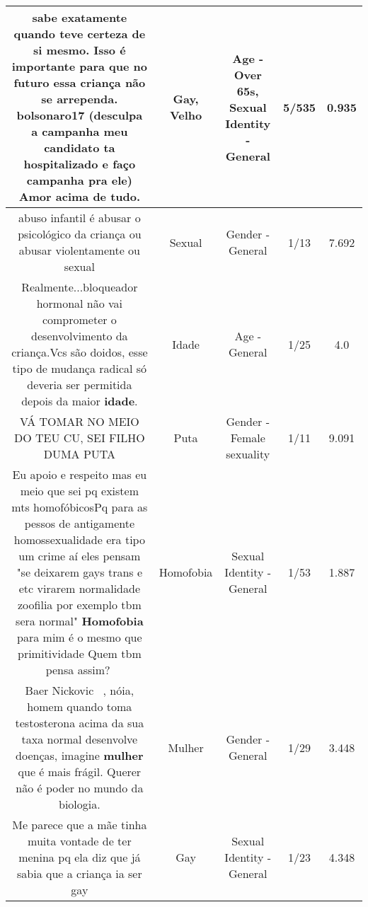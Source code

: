 \documentclass[11pt]{article}
\newlength\mylength
\begin{document}
\begin{center}
\begin{longtable}{|C{.65\mylength}|C{.30\mylength}|C{.12\mylength}|C{.12\mylength}|C{.12\mylength}|}
sabe exatamente quando teve certeza de si mesmo. Isso é importante para que no futuro essa criança não se arrependa. bolsonaro17 (desculpa a campanha meu candidato ta hospitalizado e faço campanha pra ele) Amor acima de tudo.\normalsize   & Gay, Velho & Age - Over 65s, Sexual Identity - General & 5/535 & 0.935 \\  \hline
  \small abuso infantil é abusar o psicológico da criança ou abusar violentamente ou sexual\normalsize   & Sexual & Gender - General & 1/13 & 7.692 \\  \hline
  \small Realmente...bloqueador hormonal não vai comprometer o desenvolvimento da criança.Vcs são doidos, esse tipo de mudança radical só deveria ser permitida depois da maior \textbf{idade}.\normalsize   & Idade & Age - General & 1/25 & 4.0 \\  \hline
  \small VÁ TOMAR NO MEIO DO TEU CU, SEI FILHO DUMA PUTA\normalsize   & Puta & Gender - Female sexuality & 1/11 & 9.091 \\  \hline
  \small Eu apoio e respeito mas eu meio que sei pq existem mts homofóbicosPq para as pessos de antigamente homossexualidade era tipo um crime aí eles pensam "se deixarem gays trans e etc virarem normalidade zoofilia por exemplo tbm sera normal" \textbf{Homofobia} para mim é o mesmo que primitividade Quem tbm pensa assim?🤔\normalsize   & Homofobia & Sexual Identity - General & 1/53 & 1.887 \\  \hline
  \small Baer Nickovic  , nóia, homem quando toma testosterona acima da sua taxa normal desenvolve doenças, imagine \textbf{mulher} que é mais frágil. Querer não é poder no mundo da biologia.\normalsize   & Mulher & Gender - General & 1/29 & 3.448 \\  \hline
  \small Me parece que a mãe tinha muita vontade de ter menina pq ela diz que já sabia que a criança ia ser gay\normalsize   & Gay & Sexual Identity - General & 1/23 & 4.348 \\  \hline

\end{longtable}
\end{center}
\end{document}
